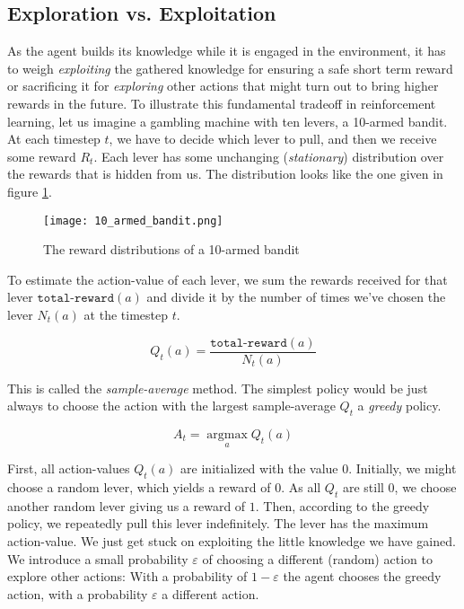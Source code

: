 \subsection{Exploration vs. Exploitation}
\label{exploration_vs_exploitation}
As the agent builds its knowledge while it is engaged in the environment, it has to weigh \textit{exploiting} the gathered knowledge for ensuring a safe short term reward or sacrificing it for \textit{exploring} other actions that might turn out to bring higher rewards in the future. To illustrate this fundamental tradeoff in reinforcement learning, let us imagine a gambling machine with ten levers, a 10-armed bandit. At each timestep $ t $, we have to decide which lever to pull, and then we receive some reward $ R_t $. Each lever has some unchanging (\textit{stationary}) distribution over the rewards that is hidden from us. The distribution looks like the one given in figure \ref{10_armed_bandit}.

\begin{figure}
    \centering
    \texttt{[image: 10\_armed\_bandit.png]}
    \caption{The reward distributions of a 10-armed bandit \cite[p. 28]{sutton_reinforcement_2018}}
    \label{10_armed_bandit}
\end{figure}

To estimate the action-value of each lever, we sum the rewards received for that lever $ \texttt{total-reward}(a) $ and divide it by the number of times we've chosen the lever $ N_t(a) $ at the timestep $ t $.

$$
    Q_t(a) = \frac{\texttt{total-reward}(a)}{N_t(a)}
$$

This is called the \textit{sample-average} method. The simplest policy would be just always to choose the action with the largest sample-average $ Q_t $ a \textit{greedy} policy.

$$
    A_t = \operatorname*{argmax}_a Q_t(a)
$$

First, all action-values $Q_t(a)$ are initialized with the value $0$. Initially, we might choose a random lever, which yields a reward of $0$. As all $ Q_t $ are still $0$, we choose another random lever giving us a reward of $1$. Then, according to the greedy policy, we repeatedly pull this lever indefinitely. The lever has the maximum action-value. We just get stuck on exploiting the little knowledge we have gained. We introduce a small probability $\varepsilon $ of choosing a different (random) action to explore other actions: With a probability of $ 1- \varepsilon $ the agent chooses the greedy action, with a probability $ \varepsilon $ a different action.

